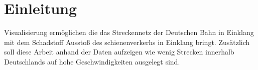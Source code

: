 \section{Einleitung}


Visualisierung ermöglichen die das Streckennetz der Deutschen Bahn in Einklang mit dem Schadstoff Ausstoß des schienenverkerhs in Einklang bringt. Zusätzlich soll diese Arbeit anhand der Daten aufzeigen wie wenig Strecken innerhalb Deutschlands auf hohe Geschwindigkeiten ausgelegt sind.
